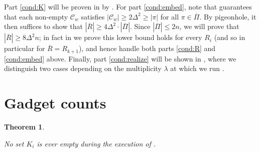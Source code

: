 \documentclass{article}
\newcommand{\cC}{\mathcal{C} }
\newtheorem{theorem}{Theorem}[section]
\theoremstyle{definition}
\begin{document}
Part \ref{cond:K} will be proven in  by . For part \ref{cond:embed}, note that  guarantees that each non-empty $\cC_w$ satisfies $|\cC_w|\ge 2\Delta^2\ge|\pi|$ for all $\pi\in \overline \Pi$. By pigeonhole, it then suffices to show that $|\overline{R}|\geq 4\Delta^2 \cdot|\overline \Pi|$. Since $|\overline\Pi|\leq 2n$, we will prove that $|\overline{R}|\geq 8\Delta^2n$; in fact in  we prove this lower bound holds for every $R_i$ (and so in particular for $\overline{R}=R_{k+1}$), and hence handle both parts \ref{cond:R} and \ref{cond:embed} above. Finally, part \ref{cond:realize} will be shown in , where we distinguish two cases depending on the multiplicity $\lambda$ at which we run .

\section{Gadget counts}\label{gadget_counts}
\begin{theorem}\label{K_size}

No set $K_i$ is ever empty during the execution of .

\end{theorem}
\end{document}

